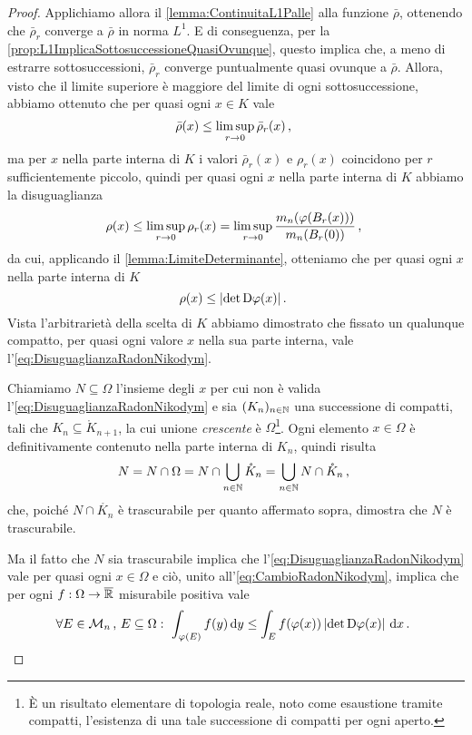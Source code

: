 \begin{proof}
	Applichiamo allora il \cref{lemma:ContinuitaL1Palle} alla funzione $\bar\rho$, ottenendo che $\bar\rho_r$ converge a $\bar\rho$ in norma $L^1$.
	E di conseguenza, per la \cref{prop:L1ImplicaSottosuccessioneQuasiOvunque}, questo implica che, a meno di estrarre sottosuccessioni, $\bar\rho_r$ converge puntualmente quasi ovunque a $\bar\rho$.
	Allora, visto che il limite superiore è maggiore del limite di ogni sottosuccessione, abbiamo ottenuto che per quasi ogni $x\in K$ vale
	\begin{equation*}
		\bar\rho(x)\le \limsup_{r\to 0} \bar\rho_r(x)\, \text{, }
	\end{equation*}
	ma per $x$ nella parte interna di $K$ i valori $\bar\rho_r(x)$ e $\rho_r(x)$ coincidono per $r$ sufficientemente piccolo, quindi per quasi ogni $x$ nella parte interna di $K$ abbiamo la disuguaglianza
	\begin{equation*}
		\rho(x)\le \limsup_{r\to 0} \rho_r(x)=\limsup_{r\to 0} \frac{m_n(\varphi(B_r(x)))}{m_n(B_r(0))}\, \text{, }
	\end{equation*}
	da cui, applicando il \cref{lemma:LimiteDeterminante}, otteniamo che per quasi ogni $x$ nella parte interna di $K$
	\begin{equation}\label{eq:DisuguaglianzaRadonNikodym}
		\rho(x)\le \lvert \det \mathrm D \varphi(x)\rvert \, \text{. }
	\end{equation}
	Vista l'arbitrarietà della scelta di $K$ abbiamo dimostrato che fissato un qualunque compatto, per quasi ogni valore $x$ nella sua parte interna, vale l'\cref{eq:DisuguaglianzaRadonNikodym}. 
	
	Chiamiamo $N\subseteq\Omega$ l'insieme degli $x$ per cui non è valida l'\cref{eq:DisuguaglianzaRadonNikodym} e sia $(K_n)_{n\in\mathbb N}$ una successione di compatti, tali che $K_n\subseteq \mathring K_{n+1}$, la cui unione \emph{crescente} è $\Omega$\footnote{È un risultato elementare di topologia reale, noto come esaustione tramite compatti, l'esistenza di una tale successione di compatti per ogni aperto.}.
	Ogni elemento $x\in\Omega$ è definitivamente contenuto nella parte interna di $K_n$, quindi risulta
	\begin{equation*}
		N=N\cap\Omega=N\cap\bigcup_{n\in\mathbb N} \mathring K_n=\bigcup_{n\in\mathbb N}N\cap\mathring K_n\, \text{, }
	\end{equation*}
	che, poiché $N\cap\mathring{K_n}$ è trascurabile per quanto affermato sopra, dimostra che $N$ è trascurabile.
	
	Ma il fatto che $N$ sia trascurabile implica che l'\cref{eq:DisuguaglianzaRadonNikodym} vale per quasi ogni $x\in\Omega$ e ciò, unito all'\cref{eq:CambioRadonNikodym}, implica che per ogni $f:\Omega\to\overline{\mathbb R}$ misurabile positiva vale
	\begin{equation*}
		\forall E\in \mathcal M_n\, \text{, } E\subseteq\Omega:\ \int_{\varphi(E)} f(y)\,\mathrm d y\le 
		\int_E f(\varphi(x))\left\lvert\det \mathrm D \varphi(x)\right\rvert\,\mathrm d x \, \text{. }
	\end{equation*}
	

\end{proof}

